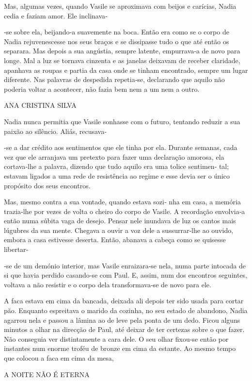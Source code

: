 Mas, algumas vezes, quando Vasile se aproximava com beijos e carícias,
Nadia cedia e faziam amor. Ele inclinava‑

‑se sobre ela, beijando‑a suavemente na boca. Então era como se o corpo
de Nadia rejuvenescesse nos seus braços e se dissipasse tudo o que até
então os separara. Mas depois a sua angústia, sempre latente,
empurrava‑a de novo para longe. Mal a luz se tornava cinzenta e as
janelas deixavam de receber claridade, apanhava as roupas e partia da
casa onde se tinham encontrado, sempre um lugar diferente. Nas palavras
de despedida repetia‑se, declarando que aquilo não poderia voltar a
acontecer, não fazia bem nem a um nem a outro.

ANA CRISTINA SILVA

Nadia nunca permitia que Vasile sonhasse com o futuro, tentando reduzir
a sua paixão ao silêncio. Aliás, recusava‑

‑se a dar crédito aos sentimentos que ele tinha por ela. Durante
semanas, cada vez que ele arranjava um pretexto para fazer uma
declaração amorosa, ela cortava‑lhe a palavra, dizendo que tudo aquilo
era uma tolice sentimen‑ tal; estavam ligados a uma rede de resistência
ao regime e esse devia ser o único propósito dos seus encontros.

Mas, mesmo contra a sua vontade, quando estava sozi‑ nha em casa, a
memória trazia‑lhe por vezes de volta o cheiro do corpo de Vasile. A
recordação envolvia‑a então numa súbita vaga de desejo. Pensar nele
inundava de luz os cantos mais lúgubres da sua mente. Chegava a ouvir a
voz dele a sussurrar‑lhe ao ouvido, embora a casa estivesse deserta.
Então, abanava a cabeça como se quisesse libertar‑

‑se de um demónio interior, mas Vasile enraizara‑se nela, numa parte
intocada de si que havia perdido casando‑se com Paul. E, assim, num dos
encontros seguintes, voltava a não resistir e o corpo dela
transformava‑se de novo para ele.

A faca estava em cima da bancada, deixada ali depois ter sido usada para
cortar pão. Enquanto espreitava o marido da cozinha, no seu estado de
abandono, Nadia agarrou nela e passou a lâmina ao de leve pela ponta de
um dedo. Ficou alguns minutos a olhar na direcção de Paul, até deixar de
ter certezas sobre o que fazer. Não conseguia ver distintamente a cara
dele. O seu olhar fixou‑se então por instantes num enorme troféu de
bronze em cima da estante. Ao mesmo tempo que colocou a faca em cima da
mesa,

A NOITE NÃO É ETERNA

